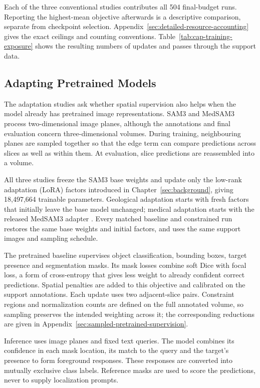 Each of the three conventional studies contributes all 504
final-budget runs. Reporting the highest-mean objective afterwards
is a descriptive comparison, separate from checkpoint selection.
Appendix~\ref{sec:detailed-resource-accounting} gives the exact ceilings
and counting conventions. Table~\ref{tab:cap-training-exposure} shows
the resulting numbers of updates and passes through the support data.

\subsection{Adapting Pretrained Models}

The adaptation studies ask whether spatial supervision also helps
when the model already has pretrained image representations. SAM3 and
MedSAM3 process two-dimensional image planes, although the annotations
and final evaluation concern three-dimensional volumes. During
training, neighbouring planes are sampled together so that the edge
term can compare predictions across slices as well as within them.
At evaluation, slice predictions are reassembled into a volume.

All three studies freeze the SAM3 base weights and update only the
low-rank adaptation (LoRA) factors introduced in Chapter~\ref{sec:background},
giving 18,497,664 trainable parameters. Geological adaptation starts
with fresh factors that initially leave the base model unchanged;
medical adaptation starts with the released MedSAM3 adapter
\cite{carion2025sam3,liu2025medsam3}. Every matched baseline and
constrained run restores the same base weights and initial factors,
and uses the same support images and sampling schedule.

The pretrained baseline supervises object classification, bounding
boxes, target presence and segmentation masks. Its mask losses combine
soft Dice with focal loss, a form of cross-entropy that gives less
weight to already confident correct predictions. Spatial penalties
are added to this objective and calibrated on the support annotations.
Each update uses two adjacent-slice pairs. Constraint regions and
normalization counts are defined on the full annotated volume, so
sampling preserves the intended weighting across it; the corresponding
reductions are given in Appendix~\ref{sec:sampled-pretrained-supervision}.

Inference uses image planes and fixed text queries. The model combines
its confidence in each mask location, its match to the query and the
target's presence to form foreground responses. These responses are
converted into mutually exclusive class labels. Reference masks are
used to score the predictions, never to supply localization prompts.

